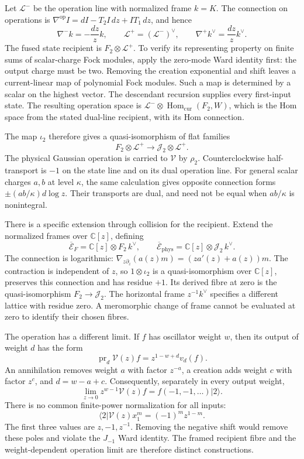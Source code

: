 Let \(\mathcal L^-\) be the operation line with normalized frame \(k=K\).
The connection on operations is
\(\nabla^{\mathrm{op}}I=dI-T_2I\,dz+IT_1\,dz\), and hence
\[
 \nabla^-k=-\frac{dz}{z}k,
 \qquad \mathcal L^+=(\mathcal L^-)^\vee,
 \qquad \nabla^+k^\vee=\frac{dz}{z}k^\vee.
\]
The fused state recipient is \(F_2\otimes\mathcal L^+\).
To verify its representing property on finite sums of scalar-charge Fock
modules, apply the zero-mode Ward identity first: the output charge must
be two. Removing the creation exponential and shift leaves a current-linear
map of polynomial Fock modules. Such a map is determined by a scalar on
the highest vector. The descendant recursion supplies every first-input
state. The resulting operation space is
\(\mathcal L^-\otimes\operatorname{Hom}_{\mathrm{cur}}(F_2,W)\), which
is the Hom space from the stated dual-line recipient, with its Hom
connection.

The map \(\iota_2\) therefore gives a quasi-isomorphism of flat families
\[
 F_2\otimes\mathcal L^+
       \longrightarrow \mathcal J_2\otimes\mathcal L^+.
\]
The physical Gaussian operation is carried to \(\mathcal V\) by
\(\rho_2\). Counterclockwise half-transport is \(-1\) on the state line
and on its dual operation line. For general scalar charges \(a,b\) at
level \(\kappa\), the same calculation gives opposite connection forms
\(\pm(ab/\kappa)d\log z\). Their transports are dual, and need not be
equal when \(ab/\kappa\) is nonintegral.

There is a specific extension through collision for the recipient.
Extend the normalized frames over \(\mathbb C[z]\), defining
\[
 \overline{\mathcal E}_F=\mathbb C[z]\otimes F_2\,k^\vee,
 \qquad
 \overline{\mathcal E}_{\mathrm{phys}}
       =\mathbb C[z]\otimes\mathcal J_2\,k^\vee.
\]
The connection is logarithmic:
\(\nabla_{z\partial_z}(a(z)m)=(za'(z)+a(z))m\).
The contraction is independent of \(z\), so
\(1\otimes\iota_2\) is a quasi-isomorphism over \(\mathbb C[z]\),
preserves this connection and has residue \(+1\). Its derived fibre at
zero is the quasi-isomorphism \(F_2\to\mathcal J_2\).
The horizontal frame \(z^{-1}k^\vee\) specifies a different lattice with
residue zero. A meromorphic change of frame cannot be evaluated at zero
to identify their chosen fibres.

The operation has a different limit. If \(f\) has oscillator weight \(w\),
then its output of weight \(d\) has the form
\[
 \operatorname{pr}_d\mathcal V(z)f=z^{1-w+d}v_d(f).
\]
An annihilation removes weight \(a\) with factor \(z^{-a}\), a creation
adds weight \(c\) with factor \(z^c\), and \(d=w-a+c\).
Consequently, separately in every output weight,
\[
 \lim_{z\to0}z^{w-1}\mathcal V(z)f
                     =f(-1,-1,\ldots)|2\rangle.
\]
There is no common finite-power normalization for all inputs:
\begin{equation}\label{eq:vol2-native-unbounded-input-poles}
       \langle2|\mathcal V(z)x_1^m=(-1)^mz^{1-m}.
\end{equation}
The first three values are \(z,-1,z^{-1}\).
Removing the negative shift would remove these poles and violate the
\(J_{-1}\) Ward identity. The framed recipient fibre and the
weight-dependent operation limit are therefore distinct constructions.

